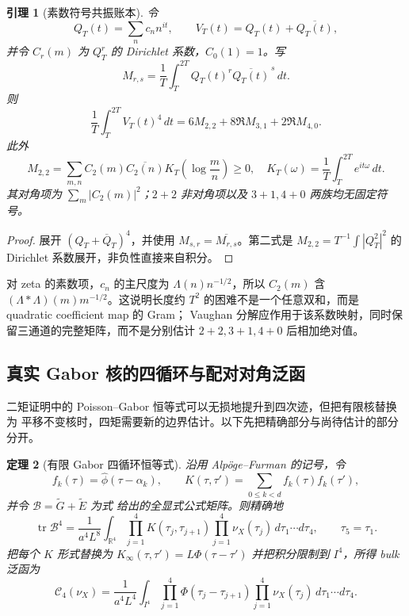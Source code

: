 \documentclass[UTF8,11pt,a4paper]{ctexart}
\newtheorem{theorem}{定理}[section]
\newtheorem{lemma}[theorem]{引理}
\theoremstyle{definition}
\theoremstyle{remark}
\newcommand{\tr}{\operatorname{tr}}
\begin{document}
\begin{lemma}[素数符号共振账本]\label{lem:prime-sign-ledger}
令
\[
 Q_T(t)=\sum_n c_n n^{it},\qquad V_T(t)=Q_T(t)+\overline{Q_T(t)},
\]
并令 $C_r(m)$ 为 $Q_T^r$ 的 Dirichlet 系数，$C_0(1)=1$。写
\[
 M_{r,s}=\frac1T\int_T^{2T}Q_T(t)^r\overline{Q_T(t)}^{\,s}\,dt.
\]
则
\[
 \frac1T\int_T^{2T}V_T(t)^4\,dt
 =6M_{2,2}+8\Re M_{3,1}+2\Re M_{4,0}.
\]
此外
\[
 M_{2,2}
 =\sum_{m,n}C_2(m)\overline{C_2(n)}
 K_T\!\left(\log\frac mn\right)\ge0,
\quad
 K_T(\omega)=\frac1T\int_T^{2T}e^{it\omega}\,dt.
\]
其对角项为 $\sum_m|C_2(m)|^2$；$2+2$ 非对角项以及
$3+1,4+0$ 两族均无固定符号。
\end{lemma}

\begin{proof}
展开 $(Q_T+\overline Q_T)^4$，并使用
$M_{s,r}=\overline{M_{r,s}}$。第二式是
$M_{2,2}=T^{-1}\int|Q_T^2|^2$ 的 Dirichlet 系数展开，非负性直接来自积分。
\end{proof}

对 zeta 的素数项，$c_n$ 的主尺度为 $\Lambda(n)n^{-1/2}$，所以
$C_2(m)$ 含 $(\Lambda*\Lambda)(m)m^{-1/2}$。这说明长度约 $T^2$
的困难不是一个任意双和，而是 quadratic coefficient map 的 Gram；
Vaughan 分解应作用于该系数映射，同时保留三通道的完整矩阵，而不是分别估计
$2+2,3+1,4+0$ 后相加绝对值。

\subsection{真实 Gabor 核的四循环与配对对角泛函}

二矩证明中的 Poisson--Gabor 恒等式可以无损地提升到四次迹，但把有限核替换为
平移不变核时，四矩需要新的边界估计。以下先把精确部分与尚待估计的部分分开。

\begin{theorem}[有限 Gabor 四循环恒等式]\label{thm:gabor-four-cycle}
沿用 Alpöge--Furman \cite[\S2]{AF26} 的记号，令
\[
 f_k(\tau)=\widehat\phi(\tau-\alpha_k),\qquad
 K(\tau,\tau')=\sum_{0\le k<d}f_k(\tau)f_k(\tau'),
\]
并令 $\mathcal B=\widetilde G+\widetilde E$ 为式 \cite[(2.11)]{AF26}
给出的全显式公式矩阵。则精确地
\[
 \tr\mathcal B^4
 =\frac1{a^4L^8}\int_{\mathbb R^4}
 \prod_{j=1}^4K(\tau_j,\tau_{j+1})
 \prod_{j=1}^4\nu_X(\tau_j)\,d\tau_1\cdots d\tau_4,
 \qquad \tau_5=\tau_1.
 \label{eq:finite-four-cycle}
\]
把每个 $K$ 形式替换为
$K_\infty(\tau,\tau')=L\Phi(\tau-\tau')$ 并把积分限制到
$I^4$，所得 bulk 泛函为
\[
 \mathcal C_4(\nu_X)
 =\frac1{a^4L^4}\int_{I^4}
 \prod_{j=1}^4\Phi(\tau_j-\tau_{j+1})
 \prod_{j=1}^4\nu_X(\tau_j)\,d\tau_1\cdots d\tau_4.
 \label{eq:bulk-four-cycle}
\]
\end{theorem}
\end{document}
